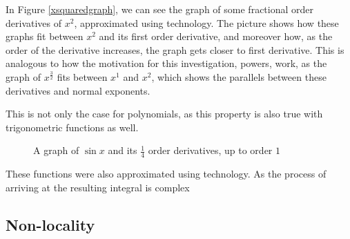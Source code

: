 \documentclass{article}
\begin{document}
In Figure \ref{xsquaredgraph}, we can see the graph of some fractional order
derivatives of $x^2$, approximated using technology. The picture shows how
these graphs fit between $x^2$ and its first order derivative, and moreover
how, as the order of the derivative increases, the graph gets closer to first
derivative. This is analogous to how the motivation for this investigation,
powers, work, as the graph of $x^\frac{3}{2}$ fits between $x^1$ and $x^2$,
which shows the parallels between these derivatives and normal exponents.

This is not only the case for polynomials, as this property is also true with
trigonometric functions as well.

\begin{figure}[H]
\def\figtwoxmax{15}
\centering
{}
\caption{A graph of $\sin{x}$ and its $\frac{1}{4}$ order derivatives, up to order $1$} \label{singraph}
\end{figure}

These functions were also approximated using technology. As the process of arriving
at the resulting integral is complex

\subsection{Non-locality} \label{nonlocality}
\end{document}

